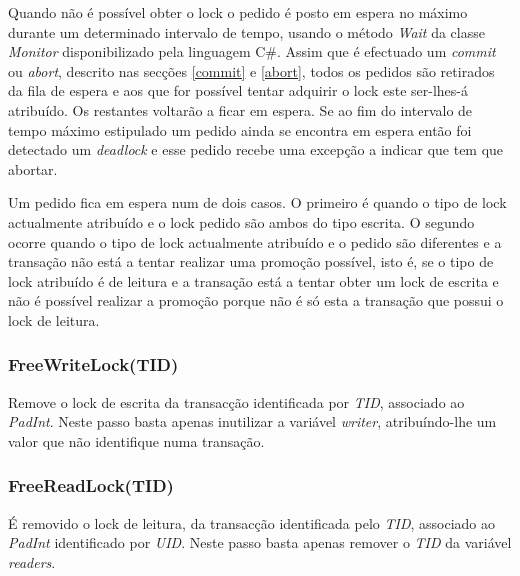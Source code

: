 Quando não é possível obter o lock o pedido é posto em espera no máximo durante um determinado intervalo de tempo, usando o método \textit{Wait} da classe \textit{Monitor} disponibilizado pela linguagem C\#. Assim que é efectuado um \textit{commit} ou \textit{abort}, descrito nas secções \ref{commit} e \ref{abort}, todos os pedidos são retirados da fila de espera e aos que for possível tentar adquirir o lock este ser-lhes-á atribuído. Os restantes voltarão a ficar em espera. Se ao fim do intervalo de tempo máximo estipulado um pedido ainda se encontra em espera então foi detectado um \textit{deadlock} e esse pedido recebe uma excepção a indicar que tem que abortar.

Um pedido fica em espera num de dois casos. O primeiro é quando o tipo de lock actualmente atribuído e o lock pedido são ambos do tipo escrita. O segundo ocorre quando o tipo de lock actualmente atribuído e o pedido são diferentes e a transação não está a tentar realizar uma promoção possível, isto é, se o tipo de lock atribuído é de leitura e a transação está a tentar obter um lock de escrita e não é possível realizar a promoção porque não é só esta a transação que possui o lock de leitura.

\subsubsection{FreeWriteLock(TID)}
\label{FreeWriteLock}
Remove o lock de escrita da transacção identificada por \textit{TID}, associado ao \textit{PadInt}.  Neste passo basta apenas inutilizar a variável \textit{writer}, atribuíndo-lhe um valor que não identifique numa transação.

\subsubsection{FreeReadLock(TID)}
\label{FreeReadLock}
É removido o lock de leitura, da transacção identificada pelo \textit{TID}, associado ao \textit{PadInt} identificado por \textit{UID}. Neste passo basta apenas remover o \textit{TID} da variável \textit{readers}.